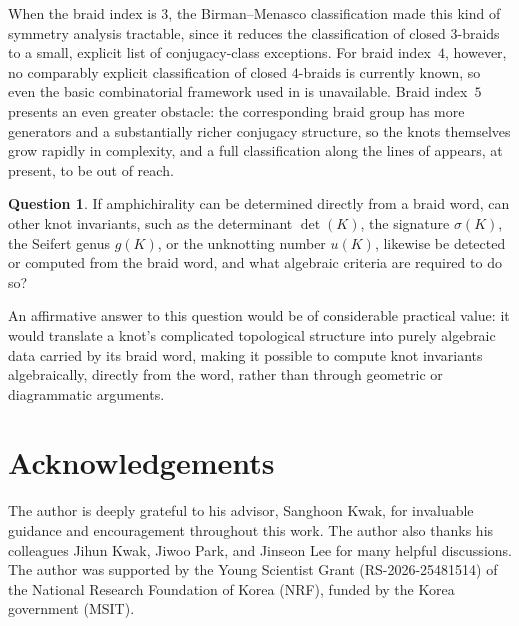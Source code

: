 \documentclass[11pt]{article}
\theoremstyle{definition}
\newtheorem{question}{Question}
\begin{document}
\noindent
When the braid index is $3$, the Birman--Menasco classification made this kind of
symmetry analysis tractable, since it reduces the classification of closed
$3$-braids to a small, explicit list of conjugacy-class exceptions. For braid
index~$4$, however, no comparably explicit classification of closed $4$-braids
is currently known, so even the basic combinatorial framework used in
 is unavailable. Braid index~$5$ presents an even greater
obstacle: the corresponding braid group has more generators and a
substantially richer conjugacy structure, so the knots themselves grow rapidly
in complexity, and a full classification along the lines of 
appears, at present, to be out of reach.

\begin{question}\label{q:invariants-from-word}
If amphichirality can be determined directly from a braid word, can other knot
invariants, such as the determinant $\det(K)$, the signature $\sigma(K)$, the
Seifert genus $g(K)$, or the unknotting number $u(K)$, likewise be detected or
computed from the braid word, and what algebraic criteria are required to do so?
\end{question}

\noindent
An affirmative answer to this question would be of considerable practical
value: it would translate a knot's complicated topological structure into
purely algebraic data carried by its braid word, making it possible to
compute knot invariants algebraically, directly from the word, rather than
through geometric or diagrammatic arguments.

\section*{Acknowledgements}
The author is deeply grateful to his advisor, Sanghoon Kwak, for invaluable
guidance and encouragement throughout this work. The author also thanks his
colleagues Jihun Kwak, Jiwoo Park, and Jinseon Lee for many helpful discussions.
The author was supported by the Young Scientist Grant (RS-2026-25481514) of the
National Research Foundation of Korea (NRF), funded by the Korea government
(MSIT).
\end{document}
